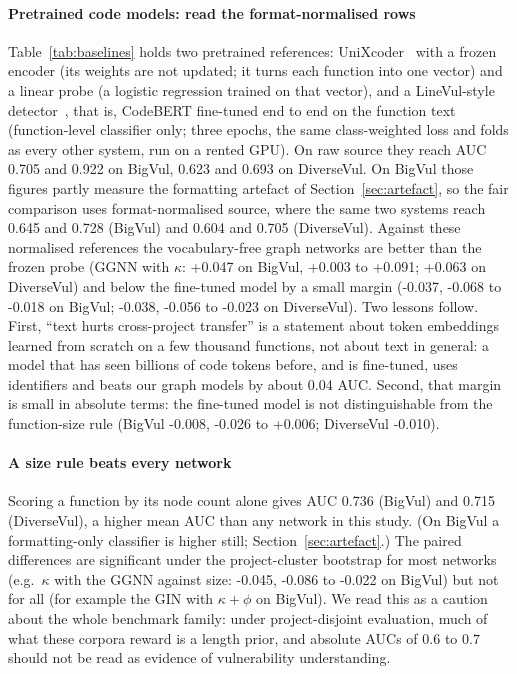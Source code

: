 \documentclass[pdflatex,sn-basic]{sn-jnl}
\theoremstyle{thmstyleone}%
\newcommand{\cBvGgnnKindVLinevulNormD}{-0.037}
\newcommand{\cBvGgnnKindVLinevulNormHi}{-0.018}
\newcommand{\cBvGgnnKindVLinevulNormLo}{-0.068}
\newcommand{\cBvGgnnKindVSizeD}{-0.045}
\newcommand{\cBvGgnnKindVSizeHi}{-0.022}
\newcommand{\cBvGgnnKindVSizeLo}{-0.086}
\newcommand{\cBvGgnnKindVUnixNormD}{+0.047}
\newcommand{\cBvGgnnKindVUnixNormHi}{+0.091}
\newcommand{\cBvGgnnKindVUnixNormLo}{+0.003}
\newcommand{\cDvGgnnKindVLinevulNormD}{-0.038}
\newcommand{\cDvGgnnKindVLinevulNormHi}{-0.023}
\newcommand{\cDvGgnnKindVLinevulNormLo}{-0.056}
\newcommand{\cDvGgnnKindVUnixNormD}{+0.063}
\newcommand{\numbvSizeAuc}{0.736}
\newcommand{\numbvUnixAuc}{0.705}
\newcommand{\numdvSizeAuc}{0.715}
\newcommand{\numdvUnixAuc}{0.623}
\newcommand{\rBvLinevulAuc}{0.922}
\newcommand{\rBvLinevulNormAuc}{0.728}
\newcommand{\rBvUnixNormAuc}{0.645}
\newcommand{\rDvLinevulAuc}{0.693}
\newcommand{\rDvLinevulNormAuc}{0.705}
\newcommand{\rDvUnixNormAuc}{0.604}
\newcommand{\xBvLinevulNormVSizeD}{-0.008}
\newcommand{\xBvLinevulNormVSizeHi}{+0.006}
\newcommand{\xBvLinevulNormVSizeLo}{-0.026}
\newcommand{\xDvLinevulNormVSizeD}{-0.010}
\begin{document}
\paragraph{Pretrained code models: read the format-normalised rows} Table~\ref{tab:baselines}
holds two pretrained references: UniXcoder~\citep{guo2022unixcoder} with a frozen
encoder (its weights are not updated; it turns each function into one vector) and
a linear probe (a logistic regression trained on that vector), and a
LineVul-style detector~\citep{fu2022linevul}, that is, CodeBERT fine-tuned
end to end on the function text (function-level classifier only; three epochs,
the same class-weighted loss and folds as every other system, run on a rented
GPU). On raw source they reach AUC \numbvUnixAuc{} and \rBvLinevulAuc{} on BigVul,
\numdvUnixAuc{} and \rDvLinevulAuc{} on DiverseVul. On BigVul those figures partly
measure the formatting artefact of Section~\ref{sec:artefact}, so the fair
comparison uses format-normalised source, where the same two systems reach
\rBvUnixNormAuc{} and \rBvLinevulNormAuc{} (BigVul) and \rDvUnixNormAuc{} and
\rDvLinevulNormAuc{} (DiverseVul). Against these normalised references the
vocabulary-free graph networks are better than the frozen probe (GGNN with
$\kappa$: \cBvGgnnKindVUnixNormD{} on BigVul, \cBvGgnnKindVUnixNormLo{} to
\cBvGgnnKindVUnixNormHi{}; \cDvGgnnKindVUnixNormD{} on DiverseVul) and below the
fine-tuned model by a small margin (\cBvGgnnKindVLinevulNormD{},
\cBvGgnnKindVLinevulNormLo{} to \cBvGgnnKindVLinevulNormHi{} on BigVul;
\cDvGgnnKindVLinevulNormD{}, \cDvGgnnKindVLinevulNormLo{} to
\cDvGgnnKindVLinevulNormHi{} on DiverseVul). Two lessons follow. First, ``text
hurts cross-project transfer'' is a statement about token embeddings learned
from scratch on a few thousand functions, not about text in general: a model that
has seen billions of code tokens before, and is fine-tuned, uses identifiers and
beats our graph models by about 0.04 AUC. Second, that margin is small in
absolute terms: the fine-tuned model is not distinguishable from the
function-size rule (BigVul \xBvLinevulNormVSizeD{}, \xBvLinevulNormVSizeLo{} to
\xBvLinevulNormVSizeHi{}; DiverseVul \xDvLinevulNormVSizeD{}).

\paragraph{A size rule beats every network} Scoring a function by its node
count alone gives AUC \numbvSizeAuc{} (BigVul) and \numdvSizeAuc{} (DiverseVul),
a higher mean AUC than any network in this study. (On BigVul a formatting-only
classifier is higher still; Section~\ref{sec:artefact}.) The paired differences are significant under
the project-cluster bootstrap for most networks (e.g.\ $\kappa$ with the GGNN
against size: \cBvGgnnKindVSizeD{}, \cBvGgnnKindVSizeLo{} to
\cBvGgnnKindVSizeHi{} on BigVul) but not for all (for example the GIN with
$\kappa{+}\phi$ on BigVul). We read this as a caution about the whole
benchmark family: under project-disjoint evaluation, much of what these
corpora reward is a length prior, and absolute AUCs of $0.6$ to $0.7$ should not
be read as evidence of vulnerability understanding.
\end{document}
